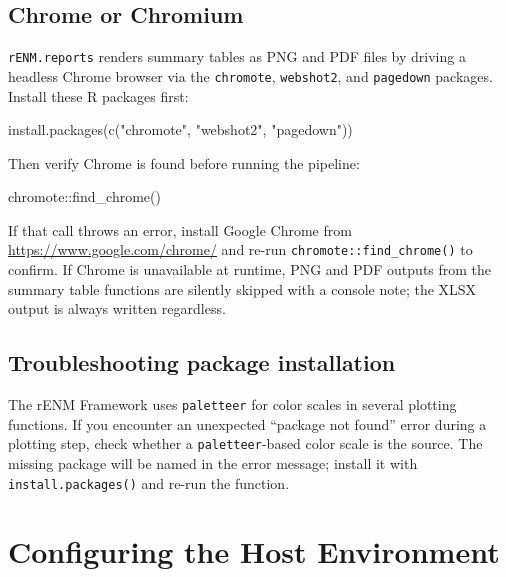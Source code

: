 \documentclass[
  letterpaper,
  DIV=11,
  numbers=noendperiod]{scrartcl}
\newenvironment{Shaded}{\begin{snugshade}}{\end{snugshade}}
\newcommand{\FunctionTok}[1]{\textcolor[rgb]{0.28,0.35,0.67}{#1}}
\newcommand{\NormalTok}[1]{\textcolor[rgb]{0.00,0.23,0.31}{#1}}
\newcommand{\SpecialCharTok}[1]{\textcolor[rgb]{0.37,0.37,0.37}{#1}}
\newcommand{\StringTok}[1]{\textcolor[rgb]{0.13,0.47,0.30}{#1}}
\begin{document}
\subsection{Chrome or Chromium}\label{chrome-or-chromium}

\texttt{rENM.reports} renders summary tables as PNG and PDF files by
driving a headless Chrome browser via the \texttt{chromote},
\texttt{webshot2}, and \texttt{pagedown} packages. Install these R
packages first:

\begin{Shaded}
\begin{Highlighting}[]
\FunctionTok{install.packages}\NormalTok{(}\FunctionTok{c}\NormalTok{(}\StringTok{"chromote"}\NormalTok{, }\StringTok{"webshot2"}\NormalTok{, }\StringTok{"pagedown"}\NormalTok{))}
\end{Highlighting}
\end{Shaded}

Then verify Chrome is found before running the pipeline:

\begin{Shaded}
\begin{Highlighting}[]
\NormalTok{chromote}\SpecialCharTok{::}\FunctionTok{find\_chrome}\NormalTok{()}
\end{Highlighting}
\end{Shaded}

If that call throws an error, install Google Chrome from
\url{https://www.google.com/chrome/} and re-run
\texttt{chromote::find\_chrome()} to confirm. If Chrome is unavailable
at runtime, PNG and PDF outputs from the summary table functions are
silently skipped with a console note; the XLSX output is always written
regardless.

\subsection{Troubleshooting package
installation}\label{troubleshooting-package-installation}

The rENM Framework uses \texttt{paletteer} for color scales in several
plotting functions. If you encounter an unexpected ``package not found''
error during a plotting step, check whether a \texttt{paletteer}-based
color scale is the source. The missing package will be named in the
error message; install it with \texttt{install.packages()} and re-run
the function.

\section{Configuring the Host
Environment}\label{configuring-the-host-environment}
\end{document}
